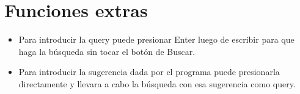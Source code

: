 \documentclass[12pt,a4paper]{article}
\begin{document}
\section{Funciones extras}\label{sec:extra}
\begin{itemize}
    \item Para introducir la query puede presionar Enter luego de escribir para que haga la búsqueda sin tocar el botón de Buscar.
    \item Para introducir la sugerencia dada por el programa puede presionarla directamente y llevara a cabo la búsqueda con esa sugerencia como query. 
     
\end{itemize}
\end{document}
